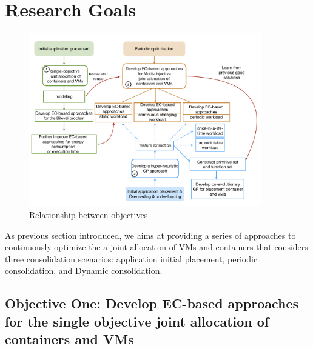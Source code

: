 \section{Research Goals}

\begin{figure}
	\centering
	\includegraphics[width=0.9\textwidth]{pics/thesisPlan.jpeg}
	\caption{Relationship between objectives}
	\label{fig:objectives}
\end{figure}

As previous section introduced, we aims at providing a series of approaches to continuously optimize the a joint allocation of VMs and containers that considers three consolidation scenarios: application initial placement, periodic consolidation, and Dynamic consolidation. 

\subsection{Objective One: Develop EC-based approaches for the single objective joint allocation of containers and VMs}
\label{sec:obj1}

